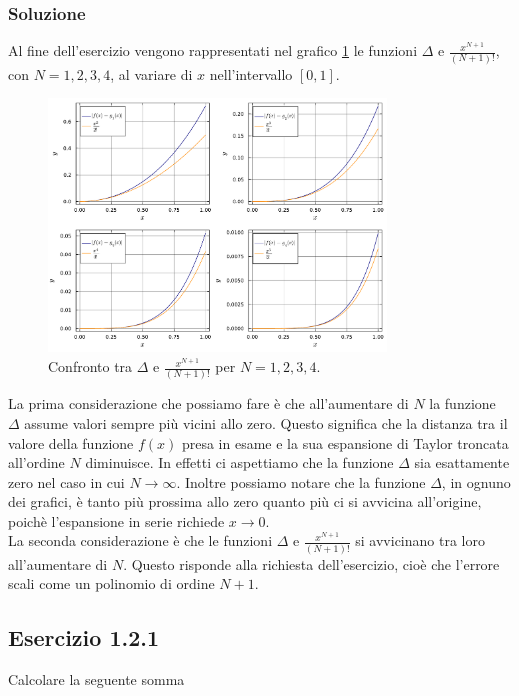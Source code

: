 \documentclass[letterpaper, 12pt]{article}
\begin{document}
\subsubsection{Soluzione}
Al fine dell'esercizio vengono rappresentati nel grafico \ref{fig:es1_0_1_1} le funzioni $\Delta$ e $\frac{x^{N+1}}{(N+1)!}$, con 
$N=1,2,3, 4$, al variare di $x$ nell'intervallo $[0,1]$. 

\begin{figure}[ht!]
    \centering
    \includegraphics[width=0.8\textwidth]{1011.pdf}
    \caption{Confronto tra $\Delta$ e $\frac{x^{N+1}}{(N+1)!}$ per $N=1,2,3, 4$.}
    \label{fig:es1_0_1_1}
\end{figure}

La prima considerazione che possiamo fare è che all'aumentare di $N$ la funzione $\Delta$ 
assume valori sempre più vicini allo zero. Questo significa che la distanza tra il valore 
della funzione $f(x)$ presa in esame e la sua espansione di Taylor troncata all'ordine 
$N$ diminuisce. In effetti ci aspettiamo che la funzione $\Delta$ sia 
esattamente zero nel caso in cui $N \rightarrow \infty$. Inoltre possiamo notare che la funzione $\Delta$, in ognuno
dei grafici, è tanto più prossima allo zero quanto più ci si avvicina all'origine, poichè l'espansione in serie 
richiede $x \rightarrow 0$.\\
La seconda considerazione è che le funzioni $\Delta$ e $\frac{x^{N+1}}{(N+1)!}$ si 
avvicinano tra loro all'aumentare di $N$. Questo risponde alla richiesta dell'esercizio, 
cioè che l'errore scali come un polinomio di ordine $N+1$. 

\subsection{Esercizio 1.2.1}
Calcolare la seguente somma
\end{document}
